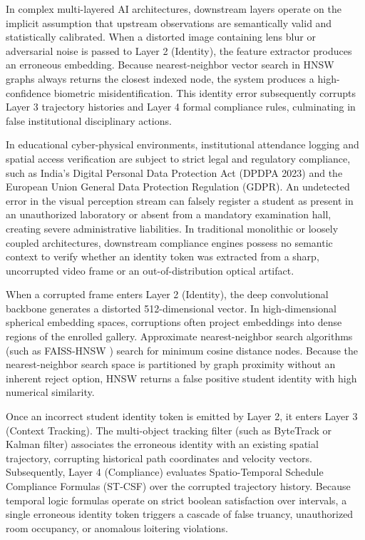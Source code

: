 \documentclass[conference]{IEEEtran}
\begin{document}
In complex multi-layered AI architectures, downstream layers operate on the implicit assumption that upstream observations are semantically valid and statistically calibrated. When a distorted image containing lens blur or adversarial noise is passed to Layer 2 (Identity), the feature extractor produces an erroneous embedding. Because nearest-neighbor vector search in HNSW graphs always returns the closest indexed node, the system produces a high-confidence biometric misidentification. This identity error subsequently corrupts Layer 3 trajectory histories and Layer 4 formal compliance rules, culminating in false institutional disciplinary actions.

In educational cyber-physical environments, institutional attendance logging and spatial access verification are subject to strict legal and regulatory compliance, such as India's Digital Personal Data Protection Act (DPDPA 2023) and the European Union General Data Protection Regulation (GDPR). An undetected error in the visual perception stream can falsely register a student as present in an unauthorized laboratory or absent from a mandatory examination hall, creating severe administrative liabilities. In traditional monolithic or loosely coupled architectures, downstream compliance engines possess no semantic context to verify whether an identity token was extracted from a sharp, uncorrupted video frame or an out-of-distribution optical artifact.

When a corrupted frame enters Layer 2 (Identity), the deep convolutional backbone generates a distorted 512-dimensional vector. In high-dimensional spherical embedding spaces, corruptions often project embeddings into dense regions of the enrolled gallery. Approximate nearest-neighbor search algorithms (such as FAISS-HNSW \cite{b3}) search for minimum cosine distance nodes. Because the nearest-neighbor search space is partitioned by graph proximity without an inherent reject option, HNSW returns a false positive student identity with high numerical similarity.

Once an incorrect student identity token is emitted by Layer 2, it enters Layer 3 (Context Tracking). The multi-object tracking filter (such as ByteTrack or Kalman filter) associates the erroneous identity with an existing spatial trajectory, corrupting historical path coordinates and velocity vectors. Subsequently, Layer 4 (Compliance) evaluates Spatio-Temporal Schedule Compliance Formulas (ST-CSF) over the corrupted trajectory history. Because temporal logic formulas operate on strict boolean satisfaction over intervals, a single erroneous identity token triggers a cascade of false truancy, unauthorized room occupancy, or anomalous loitering violations.
\end{document}
